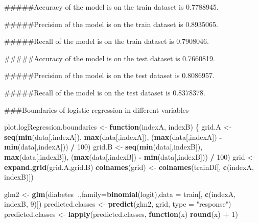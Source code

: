 \documentclass[
]{article}
\newenvironment{Shaded}{\begin{snugshade}}{\end{snugshade}}
\newcommand{\ControlFlowTok}[1]{\textcolor[rgb]{0.13,0.29,0.53}{\textbf{#1}}}
\newcommand{\DataTypeTok}[1]{\textcolor[rgb]{0.13,0.29,0.53}{#1}}
\newcommand{\DecValTok}[1]{\textcolor[rgb]{0.00,0.00,0.81}{#1}}
\newcommand{\KeywordTok}[1]{\textcolor[rgb]{0.13,0.29,0.53}{\textbf{#1}}}
\newcommand{\NormalTok}[1]{#1}
\newcommand{\OperatorTok}[1]{\textcolor[rgb]{0.81,0.36,0.00}{\textbf{#1}}}
\newcommand{\StringTok}[1]{\textcolor[rgb]{0.31,0.60,0.02}{#1}}
\begin{document}
\#\#\#\#\#Accuracy of the model is on the train dataset is 0.7788945.

\#\#\#\#\#Precision of the model is on the train dataset is 0.8935065.

\#\#\#\#\#Recall of the model is on the train dataset is 0.7908046.

\#\#\#\#\#Accuracy of the model is on the test dataset is 0.7660819.

\#\#\#\#\#Precision of the model is on the test dataset is 0.8086957.

\#\#\#\#\#Recall of the model is on the test dataset is 0.8378378.

\#\#\#Boundaries of logistic regression in different variables

\begin{Shaded}
\begin{Highlighting}[]
\NormalTok{plot.logRegression.boundaries <-}\StringTok{ }\ControlFlowTok{function}\NormalTok{(indexA, indexB) \{}
\NormalTok{  grid.A <-}\StringTok{ }\KeywordTok{seq}\NormalTok{(}\KeywordTok{min}\NormalTok{(data[,indexA]), }\KeywordTok{max}\NormalTok{(data[,indexA]), (}\KeywordTok{max}\NormalTok{(data[,indexA]) }\OperatorTok{-}\StringTok{ }\KeywordTok{min}\NormalTok{(data[,indexA])) }\OperatorTok{/}\StringTok{ }\DecValTok{100}\NormalTok{)}
\NormalTok{  grid.B <-}\StringTok{ }\KeywordTok{seq}\NormalTok{(}\KeywordTok{min}\NormalTok{(data[,indexB]), }\KeywordTok{max}\NormalTok{(data[,indexB]), (}\KeywordTok{max}\NormalTok{(data[,indexB]) }\OperatorTok{-}\StringTok{ }\KeywordTok{min}\NormalTok{(data[,indexB])) }\OperatorTok{/}\StringTok{ }\DecValTok{100}\NormalTok{)}
\NormalTok{  grid <-}\StringTok{ }\KeywordTok{expand.grid}\NormalTok{(grid.A,grid.B)}
  \KeywordTok{colnames}\NormalTok{(grid) <-}\StringTok{ }\KeywordTok{colnames}\NormalTok{(trainDf[, }\KeywordTok{c}\NormalTok{(indexA, indexB)])}
  
\NormalTok{  glm2 <-}\StringTok{ }\KeywordTok{glm}\NormalTok{(diabetes}\OperatorTok{~}\NormalTok{.,}\DataTypeTok{family=}\KeywordTok{binomial}\NormalTok{(logit),}\DataTypeTok{data =}\NormalTok{ train[, }\KeywordTok{c}\NormalTok{(indexA, indexB, }\DecValTok{9}\NormalTok{)])}
\NormalTok{  predicted.classes <-}\StringTok{ }\KeywordTok{predict}\NormalTok{(glm2, grid, }\DataTypeTok{type =} \StringTok{"response"}\NormalTok{)}
\NormalTok{  predicted.classes <-}\StringTok{ }\KeywordTok{lapply}\NormalTok{(predicted.classes, }\ControlFlowTok{function}\NormalTok{(x) }\KeywordTok{round}\NormalTok{(x) }\OperatorTok{+}\StringTok{ }\DecValTok{1}\NormalTok{)}
  

\end{Highlighting}
\end{Shaded}
\end{document}
